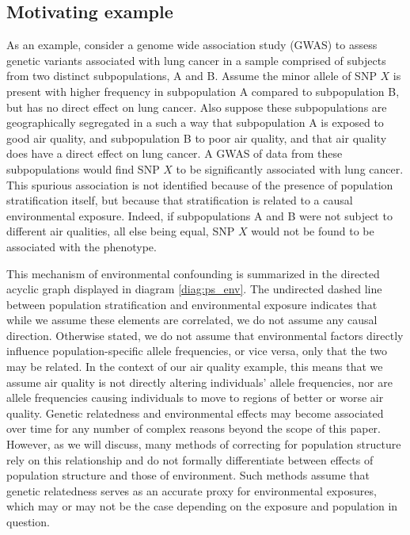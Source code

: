 \subsection{Motivating example}

As an example, consider a genome wide association study (GWAS) to assess genetic variants associated with lung cancer in a sample comprised of subjects from two distinct subpopulations, A and B. Assume the minor allele of SNP $X$ is present with higher frequency in subpopulation A compared to subpopulation B, but has no direct effect on lung cancer. Also suppose these subpopulations are geographically segregated in a such a way that subpopulation A is exposed to good air quality, and subpopulation B to poor air quality, and that air quality does have a direct effect on lung cancer. A GWAS of data from these subpopulations would find SNP $X$ to be significantly associated with lung cancer. This spurious association is not identified because of the presence of population stratification itself, but because that stratification is related to a causal environmental exposure. Indeed, if subpopulations A and B were not subject to different air qualities, all else being equal, SNP $X$ would not be found to be associated with the phenotype.


This mechanism of environmental confounding is summarized in the directed acyclic graph displayed in diagram \eqref{diag:ps_env}. The undirected dashed line between population stratification and environmental exposure indicates that while we assume these elements are correlated, we do not assume any causal direction. Otherwise stated, we do not assume that environmental factors directly influence population-specific allele frequencies, or vice versa, only that the two may be related. In the context of our air quality example, this means that we assume air quality is not directly altering individuals' allele frequencies, nor are allele frequencies causing individuals to move to regions of better or worse air quality. Genetic relatedness and environmental effects may become associated over time for any number of complex reasons beyond the scope of this paper. However, as we will discuss, many methods of correcting for population structure rely on this relationship and do not formally differentiate between effects of population structure and those of environment. Such methods assume that genetic relatedness serves as an accurate proxy for environmental exposures, which may or may not be the case depending on the exposure and population in question.

